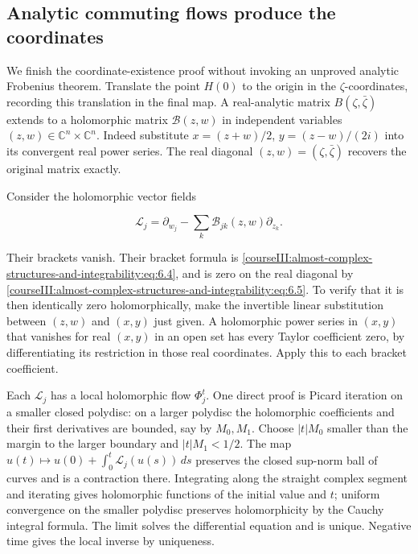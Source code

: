 \subsection{Analytic commuting flows produce the coordinates}
\label{courseIII:almost-complex-structures-and-integrability:analytic-flows}

\label{courseIII:almost-complex-structures-and-integrability:section-9}

We finish the coordinate-existence proof without invoking an unproved analytic Frobenius theorem. Translate the point \(H(0)\) to the origin in the \(\zeta\)-coordinates, recording this translation in the final map. A real-analytic matrix \(B(\zeta,\bar\zeta)\) extends to a holomorphic matrix \(\mathcal B(z,w)\) in independent variables \((z,w)\in\mathbb C^n\times\mathbb C^n\). Indeed substitute \(x=(z+w)/2\), \(y=(z-w)/(2i)\) into its convergent real power series. The real diagonal \((z,w)=(\zeta,\bar\zeta)\) recovers the original matrix exactly.

Consider the holomorphic vector fields

\begin{equation}
\mathcal L_j=\partial_{w_j}-\sum_k\mathcal B_{jk}(z,w)\partial_{z_k}.
\label{courseIII:almost-complex-structures-and-integrability:eq:9.1}
\end{equation}

Their brackets vanish. Their bracket formula is \eqref{courseIII:almost-complex-structures-and-integrability:eq:6.4}, and is zero on the real diagonal by \eqref{courseIII:almost-complex-structures-and-integrability:eq:6.5}. To verify that it is then identically zero holomorphically, make the invertible linear substitution between \((z,w)\) and \((x,y)\) just given. A holomorphic power series in \((x,y)\) that vanishes for real \((x,y)\) in an open set has every Taylor coefficient zero, by differentiating its restriction in those real coordinates. Apply this to each bracket coefficient.

Each \(\mathcal L_j\) has a local holomorphic flow \(\Phi_j^t\). One direct proof is Picard iteration on a smaller closed polydisc: on a larger polydisc the holomorphic coefficients and their first derivatives are bounded, say by \(M_0,M_1\). Choose \(|t|M_0\) smaller than the margin to the larger boundary and \(|t|M_1<1/2\). The map
\(u(t)\mapsto u(0)+\int_0^t\mathcal L_j(u(s))\,ds\)
preserves the closed sup-norm ball of curves and is a contraction there. Integrating along the straight complex segment and iterating gives holomorphic functions of the initial value and \(t\); uniform convergence on the smaller polydisc preserves holomorphicity by the Cauchy integral formula. The limit solves the differential equation and is unique. Negative time gives the local inverse by uniqueness.

